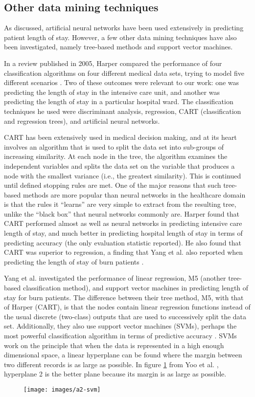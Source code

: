 \subsection{Other data mining techniques}
As discussed, artificial neural networks have been used extensively in
predicting patient length of stay. However, a few other data mining techniques
have also been investigated, namely tree-based methods and support vector
machines.

In a review published in 2005, Harper compared the performance of four
classification algorithms on four different medical data sets, trying to
model five different scenarios \citep{Harper2005}. Two of these outcomes were
relevant to our work: one was predicting the length of stay in the intensive
care unit, and another was predicting the length of stay in a particular
hospital ward. The classification techniques he used were discriminant
analysis, regression, CART (classification and regression trees),
and artificial neural networks.

CART has been extensively used in medical decision making, and at its heart
involves an algorithm that is used to split the data set into sub-groups of
increasing similarity. At each node in the tree, the algorithm examines the
independent variables and splits the data set on the variable that produces
a node with the smallest variance (i.e., the greatest similarity). This is
continued until defined stopping rules are met. One of the major reasons that
such tree-based methods are more popular than neural networks in the
healthcare domain is that the rules it ``learns'' are very simple to extract
from the resulting tree, unlike the ``black box'' that neural networks commonly
are. Harper found that CART performed almost as well as neural networks in
predicting intensive care length of stay, and much better in predicting
hospital length of stay in terms of predicting accuracy (the only evaluation
statistic reported). He also found that CART was superior to regression, a
finding that Yang et al. also reported when predicting the length of stay of
burn patients \citep{Yang2010}.

Yang et al. investigated the performance of linear regression, M5 (another
tree-based classification method), and support vector machines in predicting
length of stay for burn patients. The difference between their tree method,
M5, with that of Harper (CART), is that the nodes contain linear regression
functions instead of the usual discrete (two-class) outputs that are used to
successively split the data set. Additionally, they also use support vector
machines (SVMs), perhaps the most powerful classification algorithm in terms of
predictive accuracy \citep{Bellazzi2008}. SVMs work on the principle that when
the data is represented in a high enough dimensional space, a linear hyperplane
can be found where the margin between two different records is as large as
possible. In figure \ref{svm} from Yoo et al. \citep{Yoo2012}, hyperplane 2
is the better plane because its margin is as large as possible. 
\begin{figure}[h]
\label{svm}
\caption{}
\centering
\texttt{[image: images/a2-svm]}
\end{figure}

